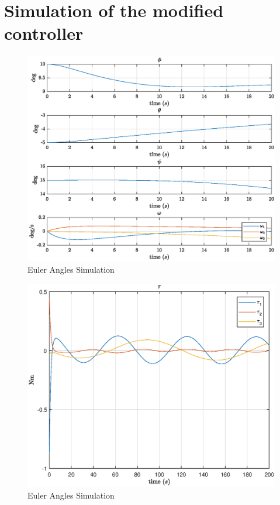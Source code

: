\section{Simulation of the modified controller}


\begin{figure}[h!]
    \centering
    \includegraphics[scale=0.8]{eulang2.eps}
    \caption{Euler Angles Simulation}
    \label{fig:eulang2}
\end{figure}


\begin{figure}[h!]
    \centering
    \includegraphics[scale=0.95]{tau2.eps}
    \caption{Euler Angles Simulation}
    \label{fig:tau2}
\end{figure}